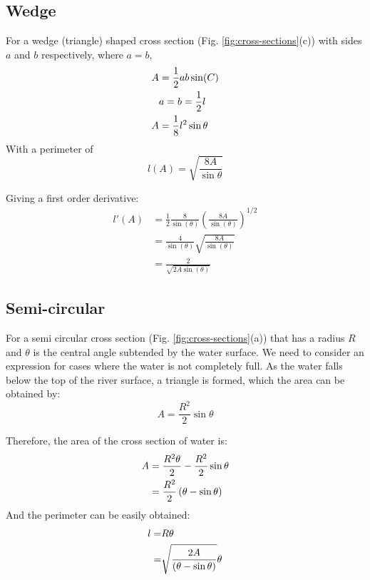 \documentclass[12pt]{article}
\begin{document}
\subsection{Wedge}
\label{appendix:wedge}
For a wedge (triangle) shaped cross section (Fig. \ref{fig:cross-sections}(c)) with sides $a$ and $b$ respectively, where $a = b$,
\begin{align}
    A &= \frac{1}{2}ab\sin(C) \notag
    \\&a = b = \frac{1}{2}l \notag
    \\A &= \frac{1}{8}l^2\sin{\theta}
\end{align}
With a perimeter of 
\begin{equation}
    l(A) = \sqrt{\frac{8A}{\sin{\theta}}}
\end{equation}

Giving a first order derivative:
\begin{equation}
    \begin{split}
          l'(A) &= \frac{1}{2}\frac{8}{\sin(\theta)}\left(\frac{8A}{\sin(\theta)}\right)^{1/2}
          \\&=\frac{4}{\sin(\theta)}\sqrt{\frac{8A}{\sin(\theta)}}
          \\&=\frac{2}{\sqrt{2A\sin(\theta)}}
    \end{split}
\end{equation}

\subsection{Semi-circular}
\label{appendix:semi-circular}
For a semi circular cross section (Fig. \ref{fig:cross-sections}(a)) that has a radius $R$ and $\theta$ is the central angle subtended by the water surface. We need to consider an expression for cases where the water is not completely full. As the water falls below the top of the river surface, a triangle is formed, which the area can be obtained by:
\begin{equation}
    A = \frac{R^2}{2} \sin\theta
\end{equation}

Therefore, the area of the cross section of water is:
\begin{align}
    A &=\frac{R^2 \theta}{2} - \frac{R^2}{2}\sin\theta \\
      &= \frac{R^2}{2}\left(\theta - \sin\theta\right) \notag
\end{align}
And the perimeter can be easily obtained:
\begin{align}
    l =& R\theta \\
        =& \sqrt{\frac{2A}{\left(\theta - \sin\theta\right)}}\theta \notag
\end{align}
\end{document}
